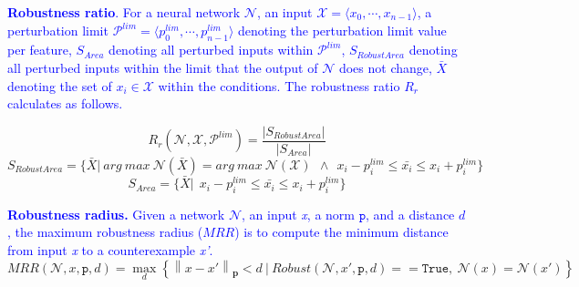 \textcolor{blue}{\textbf{Robustness ratio}. For a neural network $\mathcal{N}$, an input $\mathcal{X}=\langle x_0, \dotsm, x_{n-1} \rangle$, a perturbation limit $\mathcal{P}^{lim}= \langle p^{lim}_{0}, \dotsm, p^{lim}_{n-1} \rangle$ denoting the perturbation limit value per feature, $S_{Area}$ denoting all perturbed inputs within $\mathcal{P}^{lim}$, $S_{RobustArea}$ denoting all perturbed inputs within the limit that the output of $\mathcal{N}$ does not change, $\bar{X}$ denoting the set of $x_i\in \mathcal{X}$ within the conditions.  The robustness ratio $R_{r}$ calculates as follows.}

\begin{equation}   R_{r}(\mathcal{N},\mathcal{X},\mathcal{P}^{lim})=\frac{\lvert S_{RobustArea}\rvert}{\lvert S_{Area}\rvert}
\end{equation}
\begin{equation}
    S_{RobustArea}=\lbrace\bar{X}|\:arg\:max\:\mathcal{N}(\bar{X}) =arg\:max\:\mathcal{N}(\mathcal{X})\:\:\wedge\:\: x_i-p^{lim}_i\leqslant \bar{x_i}\leqslant x_i + p^{lim}_i\rbrace
\end{equation}
\begin{equation}
    S_{Area}=\lbrace\bar{X}|\:\: x_i-p^{lim}_i\leqslant \bar{x_i}\leqslant x_i + p^{lim}_i\rbrace
\end{equation}

\textcolor{blue}{\textbf{Robustness radius.} Given a network $\mathcal{N}$, an input \emph{x}, a norm $\mathtt{p}$, and a distance $d$, the maximum robustness radius ($MRR$) is to compute the minimum distance from input \emph{x} to a counterexample \emph{x'}.}
\begin{equation}
        MRR(\mathcal{N},x,\mathtt{p},d)=\max_{d}\left\{ \left\| x-x' \right\|_\mathbf{p} < d \ |\  Robust({\mathcal{N}, x',\mathtt{p},d}) == \texttt{True},\  \mathcal{N}(x) = \mathcal{N}(x')\right\}
\end{equation}

